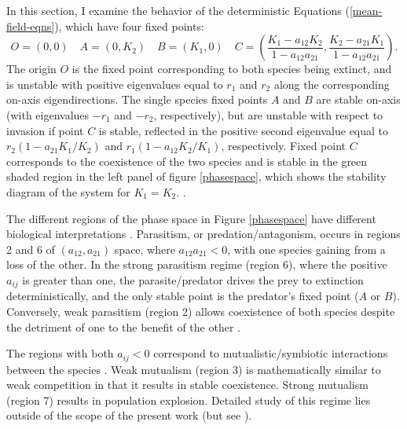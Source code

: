 In this section, I examine the behavior of the deterministic Equations (\ref{mean-field-eqns}), which have four fixed points:
\begin{equation}
O = (0,0) \quad A = (0,K_2) \quad B = (K_1,0) \quad C = (\frac{K_1-a_{12} K_2}{1-a_{12}a_{21}},\frac{K_2-a_{21} K_1}{1-a_{12}a_{21}}). %
\end{equation}
The origin $O$ is the fixed point corresponding to both species being extinct, and is unstable with positive eigenvalues equal to $r_1$ and $r_2$ along the corresponding on-axis eigendirections. 
The single species fixed points $A$ and $B$ are stable on-axis (with eigenvalues $-r_1$ and $-r_2$, respectively), but are unstable with respect to invasion if point $C$ is stable, reflected in the positive second eigenvalue equal to $r_2(1-a_{21}K_1/K_2)$ and $r_1(1-a_{12}K_2/K_1)$, respectively. 
Fixed point $C$ corresponds to the coexistence of the two species and is stable in the green shaded region in the left panel of figure \ref{phasespace}, which shows the stability diagram of the system for $K_1=K_2$. \cite{Neuhauser1999,Cox2010,Chotibut2015}. %

The different regions of the phase space in Figure \ref{phasespace} have different biological interpretations \cite{May2001,Abrams1977}. 
Parasitism, or predation/antagonism, occurs in regions 2 and 6 of $(a_{12}, a_{21})$ space, where $a_{12}a_{21}<0$, with one species gaining from a loss of the other. 
In the strong parasitism regime (region 6), where the positive $a_{ij}$ is greater than one, the parasite/predator drives the prey to extinction deterministically, and the only stable point is the predator's fixed point ($A$ or $B$). 
Conversely, weak parasitism (region 2) allows coexistence of both species despite the detriment of one to the benefit of the other \cite{May2001,Chotibut2015}. 

The regions with both $a_{ij}<0$ correspond to mutualistic/symbiotic interactions between the species \cite{Neuhauser1999,Cox2010,Chotibut2015,May2001}. 
Weak mutualism (region 3) is mathematically similar to weak competition in that it results in stable coexistence. 
Strong mutualism (region 7) results in population explosion. 
Detailed study of this regime lies outside of the scope of the present work (but see \cite{Meerson2008}).

